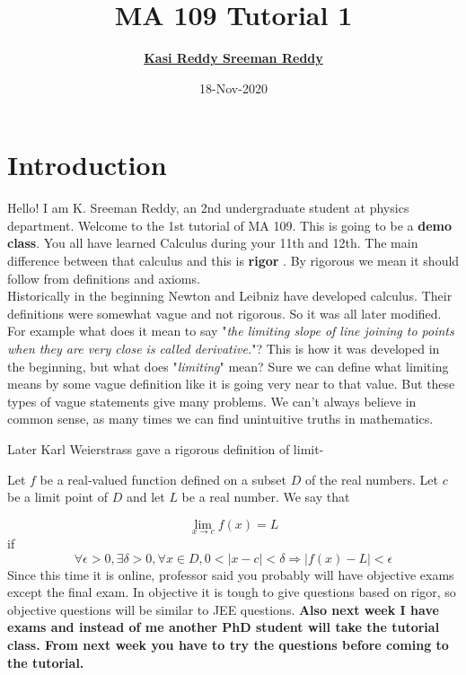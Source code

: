 \documentclass[11pt]{beamer}
\author[K. Sreeman Reddy]{\href{http://iamsreeman.github.io/}{\textbf{Kasi Reddy Sreeman Reddy}}\linebreak\text{2nd year physics student}\linebreak\text{\href{http://iamsreeman.github.io/MA109}{http://iamsreeman.github.io/MA109}}}
\title{MA 109 Tutorial 1}
\institute[]{IIT Bombay}
\date{18-Nov-2020}
\begin{document}
\begin{frame}
\titlepage
\end{frame}


\section{Introduction}
Hello! I am K. Sreeman Reddy, an 2nd undergraduate student at physics department. Welcome to the 1st tutorial of MA 109. This is going to be a \textbf{demo class}. You all have learned Calculus during your 11th and 12th. The main difference between that calculus and this is \textbf{rigor }. By rigorous we mean it should follow from definitions and axioms.\\
Historically in the beginning Newton and Leibniz have developed calculus. Their definitions were somewhat vague and not rigorous. So it was all later modified. For example what does it mean to say "\textit{the limiting slope of line joining to points when they are very close is called derivative.}"? This is how it was developed in the beginning, but what does "\textit{limiting}" mean? Sure we can define what limiting means by some vague definition like it is going very near to that value. But these types of vague statements give many problems. We can't always believe in common sense, as many times we can find unintuitive truths in mathematics. 
\begin{frame}
Later Karl Weierstrass gave a rigorous definition of limit-
\begin{definition}
Let ${\displaystyle f}$ be a real-valued function defined on a subset $ {\displaystyle D}$ of the real numbers. Let ${\displaystyle c}$ be a limit point of ${\displaystyle D}$ and let ${\displaystyle L}$ be a real number. We say that

    $${\displaystyle \lim _{x\to c}f(x)=L}$$
if
$$\forall \epsilon>0,\exists\delta>0,\forall x\in D,0<|x-c|<\delta\Rightarrow |f(x)-L|<\epsilon$$
Since this time it is online, professor said you probably will have objective exams except the final exam. In objective it is tough to give questions based on rigor, so objective questions will be similar to JEE questions. \textbf{Also next week I have exams and instead of me another PhD student will take the tutorial class. From next week you have to try the questions before coming to the tutorial.}
\end{definition}
\end{frame} 
\end{document}
